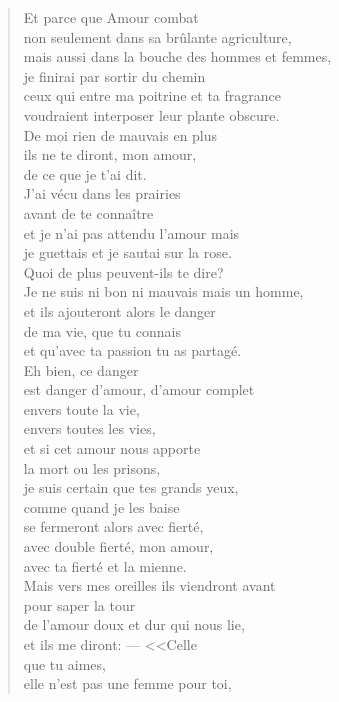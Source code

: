 \documentclass[11pt,a4paper]{book}
\begin{document}
\begin{verse}
Et parce que Amour combat \\
non seulement dans sa brûlante agriculture, \\
mais aussi dans la bouche des hommes et femmes, \\
je finirai par sortir du chemin \\
ceux qui entre ma poitrine et ta fragrance \\
voudraient interposer leur plante obscure. \\
De moi rien de mauvais en plus \\
ils ne te diront, mon amour, \\
de ce que je t'ai dit. \\
J'ai vécu dans les prairies \\
avant de te connaître \\
et je n'ai pas attendu l'amour mais \\
je guettais et je sautai sur la rose. \\
Quoi de plus peuvent-ils te dire? \\
Je ne suis ni bon ni mauvais mais un homme, \\
et ils ajouteront alors le danger \\
de ma vie, que tu connais \\
et qu'avec ta passion tu as partagé. \\
Eh bien, ce danger \\
est danger d'amour, d'amour complet \\
envers toute la vie, \\
envers toutes les vies, \\
et si cet amour nous apporte \\
la mort ou les prisons, \\
je suis certain que tes grands yeux, \\
comme quand je les baise \\
se fermeront alors avec fierté, \\
avec double fierté, mon amour, \\
avec ta fierté et la mienne. \\
Mais vers mes oreilles ils viendront avant \\
pour saper la tour \\
de l'amour doux et dur qui nous lie, \\
et ils me diront: --- <<Celle \\
que tu aimes, \\
elle n'est pas une femme pour toi, \\

\end{verse}
\end{document}
